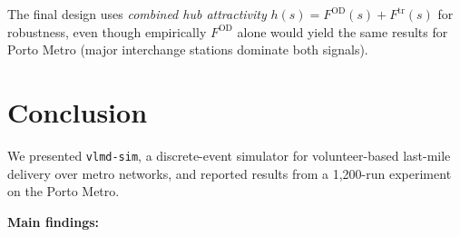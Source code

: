 \documentclass[11pt,a4paper]{article}
\begin{document}
The final design uses \emph{combined hub attractivity}
$h(s)=F^{\mathrm{OD}}(s)+F^{\mathrm{tr}}(s)$ for robustness, even though
empirically $F^{\mathrm{OD}}$ alone would yield the same results for Porto
Metro (major interchange stations dominate both signals).

\section{Conclusion}

We presented \texttt{vlmd-sim}, a discrete-event simulator for volunteer-based
last-mile delivery over metro networks, and reported results from a
1{,}200-run experiment on the Porto Metro.

\textbf{Main findings:}
\end{document}
